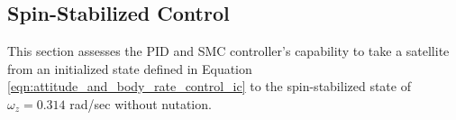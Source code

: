 \subsection{Spin-Stabilized Control}
\label{subsec:SpinStabilizedControl}

This section assesses the PID and SMC controller's capability to take a satellite from an initialized state defined in Equation \ref{eqn:attitude_and_body_rate_control_ic} to the spin-stabilized state of $\omega_z = 0.314$ rad/sec without nutation.









